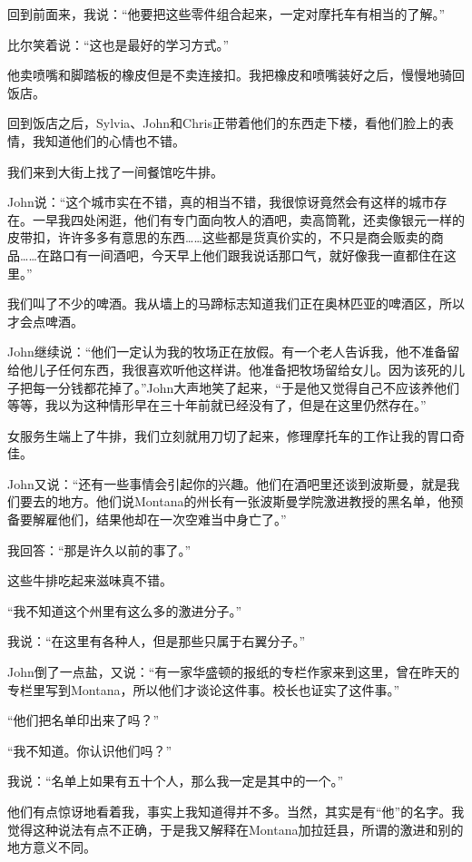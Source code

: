 \documentclass[UTF8]{article}
\begin{document}
\par 回到前面来，我说：“他要把这些零件组合起来，一定对摩托车有相当的了解。”
\par 比尔笑着说：“这也是最好的学习方式。”
\par 他卖喷嘴和脚踏板的橡皮但是不卖连接扣。我把橡皮和喷嘴装好之后，慢慢地骑回饭店。
\par 回到饭店之后，Sylvia、John和Chris正带着他们的东西走下楼，看他们脸上的表情，我知道他们的心情也不错。
\par 我们来到大街上找了一间餐馆吃牛排。
\par John说：“这个城市实在不错，真的相当不错，我很惊讶竟然会有这样的城市存在。一早我四处闲逛，他们有专门面向牧人的酒吧，卖高筒靴，还卖像银元一样的皮带扣，许许多多有意思的东西……这些都是货真价实的，不只是商会贩卖的商品……在路口有一间酒吧，今天早上他们跟我说话那口气，就好像我一直都住在这里。”
\par 我们叫了不少的啤酒。我从墙上的马蹄标志知道我们正在奥林匹亚的啤酒区，所以才会点啤酒。
\par John继续说：“他们一定认为我的牧场正在放假。有一个老人告诉我，他不准备留给他儿子任何东西，我很喜欢听他这样讲。他准备把牧场留给女儿。因为该死的儿子把每一分钱都花掉了。”John大声地笑了起来，“于是他又觉得自己不应该养他们等等，我以为这种情形早在三十年前就已经没有了，但是在这里仍然存在。”
\par 女服务生端上了牛排，我们立刻就用刀切了起来，修理摩托车的工作让我的胃口奇佳。
\par John又说：“还有一些事情会引起你的兴趣。他们在酒吧里还谈到波斯曼，就是我们要去的地方。他们说Montana的州长有一张波斯曼学院激进教授的黑名单，他预备要解雇他们，结果他却在一次空难当中身亡了。”
\par 我回答：“那是许久以前的事了。”
\par 这些牛排吃起来滋味真不错。
\par “我不知道这个州里有这么多的激进分子。”
\par 我说：“在这里有各种人，但是那些只属于右翼分子。”
\par John倒了一点盐，又说：“有一家华盛顿的报纸的专栏作家来到这里，曾在昨天的专栏里写到Montana，所以他们才谈论这件事。校长也证实了这件事。”
\par “他们把名单印出来了吗？”
\par “我不知道。你认识他们吗？”
\par 我说：“名单上如果有五十个人，那么我一定是其中的一个。”
\par 他们有点惊讶地看着我，事实上我知道得并不多。当然，其实是有“他”的名字。我觉得这种说法有点不正确，于是我又解释在Montana加拉廷县，所谓的激进和别的地方意义不同。
\end{document}
